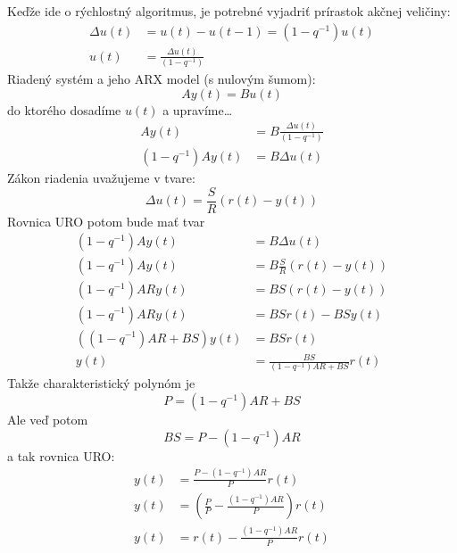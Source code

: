 \documentclass[a4paper, 10pt, ]{article}
\begin{document}
Keďže ide o rýchlostný algoritmus, je potrebné vyjadriť prírastok akčnej veličiny:
\begin{align}
	 \Delta u(t) &= u(t) - u(t-1) = (1 - q^{-1})u(t) \\
	 u(t) &= \frac{\Delta u(t)}{(1 - q^{-1})}
\end{align}
Riadený systém a jeho ARX model (s nulovým šumom):
\begin{equation}
	Ay(t) = Bu(t)
\end{equation}
do ktorého dosadíme $u(t)$ a upravíme\ldots
\begin{subequations}
	\begin{align}
		 Ay(t) &= B\frac{\Delta u(t)}{(1 - q^{-1})} \\
		 (1 - q^{-1})Ay(t) &= B\Delta u(t)
	\end{align}
\end{subequations}
Zákon riadenia uvažujeme v tvare:
\begin{equation}
	\Delta u(t) = \frac{S}{R}(r(t) - y(t))
\end{equation}
Rovnica URO potom bude mať tvar
\begin{subequations}
	\begin{align}
		 (1 - q^{-1})Ay(t) &= B\Delta u(t) \\
		 (1 - q^{-1})Ay(t) & = B \frac{S}{R}(r(t) - y(t)) \\
		 (1 - q^{-1})ARy(t) &= BS(r(t) - y(t)) \\
		 (1 - q^{-1})ARy(t) &= BSr(t) - BSy(t) \\
		 ((1-q^{-1})AR + BS) y(t) &= BSr(t) \\
		 y(t) &= \frac{BS}{(1-q^{-1})AR + BS}r(t)
	\end{align}
\end{subequations}
Takže charakteristický polynóm je
\begin{equation}
	P = \left( 1 - q^{-1} \right) AR + BS
\end{equation}
Ale veď potom
\begin{equation}
	BS = P - \left( 1 - q^{-1} \right)AR
\end{equation}
a tak rovnica URO:
\begin{subequations}
	\begin{align}
		y(t) &= \frac{P - (1-q^{-1})AR}{P}r(t) \\
		y(t) &=\left({\frac{P}{P} -  \frac{(1-q^{-1})AR}{P}}\right)r(t) \\
		y(t) &= r(t) -  \frac{(1-q^{-1})AR}{P}r(t)
	\end{align}
\end{subequations}
\end{document}
